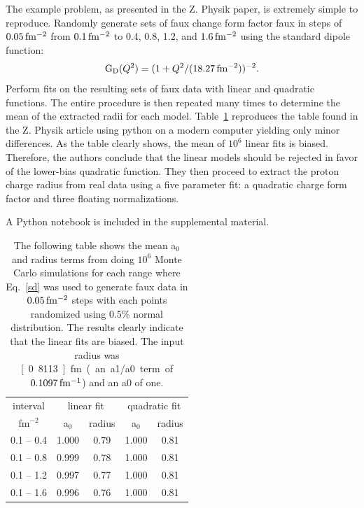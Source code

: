 \documentclass[10pt,aps,prc,twocolumn]{revtex4-1}
\begin{document}
The example problem, as presented in the Z. Physik paper, is extremely simple to reproduce.   
Randomly generate sets of faux change form factor faux in steps of $\unit[0.05]{fm^{-2}}$ from $\unit[0.1]{fm^{-2}}$ to 0.4, 0.8, 1.2,
and $\unit[1.6]{fm^{-2}}$ using the standard dipole function:
\begin{equation}
\label{sd}
\mathrm{G_D}(Q^2) = ( 1 + Q^2/(\unit[18.27]{fm^{-2}}))^{-2}.
\end{equation}
Perform fits on the resulting sets of faux data with linear and quadratic functions. The entire procedure is
then repeated many times to determine the mean of the extracted radii for each model. Table~\ref{ztable} reproduces the table found in the
Z. Physik article using python on a modern computer yielding only minor differences.
As the table clearly shows, the mean of $10^6$ linear fits is biased. 
Therefore, the authors conclude that the linear models should be rejected in favor of the lower-bias quadratic function.
They then proceed to extract the proton charge radius from real data using a five parameter fit: a quadratic charge form factor and three floating normalizations.

A Python notebook is included in the supplemental material.

\begin{table}
\label{ztable}
\caption{The following table shows the mean a$_0$ and radius terms from doing $10^6$ Monte Carlo simulations
for each range
where Eq.~\ref{sd} was used to generate faux data in $\unit[0.05]{fm^{-2}}$ steps with each points randomized using
0.5\% normal distribution.   The results clearly indicate that the linear fits are biased.   The input
radius was \unit[0.8113]{fm} (an a1/a0 term of $\unit[0.1097]{fm^{-1}}$) and an a0 of one.}
\begin{tabular}{c|cc|cc} \hline
interval       & \multicolumn{2}{c|}{linear fit} & \multicolumn{2}{c}{quadratic fit}  \\
fm$^{-2}$      & a$_0$      & radius          & a$_0$    & radius \\ \hline
 0.1 -- 0.4 & 1.000& 0.79& 1.000& 0.81 \\
 0.1 -- 0.8 & 0.999& 0.78& 1.000& 0.81 \\
 0.1 -- 1.2 & 0.997& 0.77& 1.000& 0.81 \\
 0.1 -- 1.6 & 0.996& 0.76& 1.000& 0.81 \\ \hline
\end{tabular}
\end{table}
\end{document}

